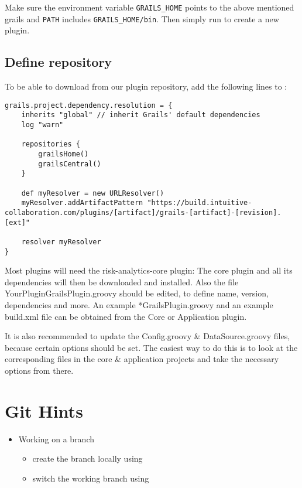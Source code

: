 Make sure the environment variable \texttt{GRAILS\_HOME} points to the above mentioned
grails and \texttt{PATH} includes \texttt{GRAILS\_HOME/bin}.
Then simply run  to create a new plugin.

\subsection{Define \PO{} repository}

To be able to download from our plugin repository, add the following lines to
:
\begin{verbatim}
grails.project.dependency.resolution = {
    inherits "global" // inherit Grails' default dependencies
    log "warn"

    repositories {
        grailsHome()
        grailsCentral()
    }

    def myResolver = new URLResolver()
    myResolver.addArtifactPattern "https://build.intuitive-collaboration.com/plugins/[artifact]/grails-[artifact]-[revision].[ext]"

    resolver myResolver
}
\end{verbatim}

Most plugins will need the risk-analytics-core plugin:
The core plugin and all its dependencies will then be downloaded and installed.
Also the file YourPluginGrailsPlugin.groovy should be edited, to define name, version, dependencies and more.
An example *GrailsPlugin.groovy and an example build.xml file can be obtained from the Core or Application plugin.

It is also recommended to update the Config.groovy & DataSource.groovy files, because certain options should be set.
The easiest way to do this is to look at the corresponding files in the core & application projects and take the necessary options from there.

\section{Git Hints}

\begin{itemize}
	\item Working on a branch
	\begin{itemize}
		\item create the branch locally using 
		\item switch the working branch using 
	\end{itemize}
\end{itemize}

